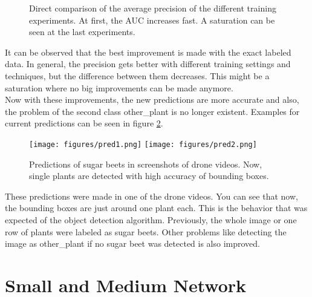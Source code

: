 \begin{figure}
	\centering
	\caption{Direct comparison of the average precision of the different training experiments. At first, the AUC increases fast. A saturation can be seen at the last experiments.}
	\label{fig:direct_comparison}
\end{figure}

It can be observed that the best improvement is made with the exact labeled data. In general, the precision gets better with different training settings and techniques, but the difference between them decreases. This might be a saturation where no big improvements can be made anymore. \\

Now with these improvements, the new predictions are more accurate and also, the problem of the second class other\_plant is no longer existent. Examples for current predictions can be seen in figure \ref{fig:current_predictions}.

\begin{figure}[htb!]
	\centering
	\texttt{[image: figures/pred1.png]}
	\texttt{[image: figures/pred2.png]}
	\caption{Predictions of sugar beets in screenshots of drone videos. Now, single plants are detected with high accuracy of bounding boxes. }
	\label{fig:current_predictions}
\end{figure}

These predictions were made in one of the drone videos. You can see that now, the bounding boxes are just around one plant each. This is the behavior that was expected of the object detection algorithm. Previously, the whole image or one row of plants were labeled as sugar beets. Other problems like detecting the image as other\_plant if no sugar beet was detected is also improved. 

\section{Small and Medium Network}

